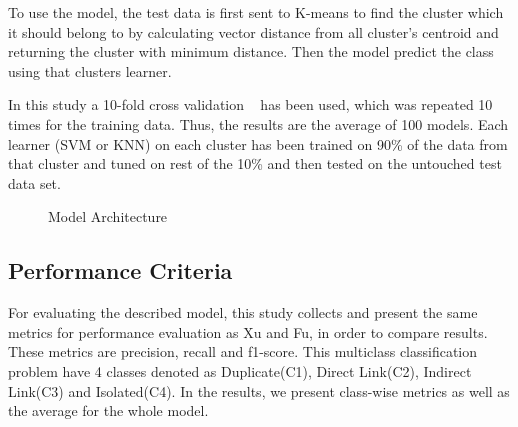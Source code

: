 \documentclass[sigconf]{acmart}
\theoremstyle{break}
\begin{document}
    To use the model, the test data is first sent to K-means to find the cluster which it should belong to by calculating vector distance from all cluster's centroid and returning the cluster with minimum distance. Then the model predict the class using that cluster\textquotesingle s learner.
    
    In this study a 10-fold cross validation ~\cite{kohavi1995study} has been used, which was repeated 10 times for the training data. Thus, the results are the average of 100 models. Each learner (SVM or KNN) on each cluster has been trained on 90\% of the data from that cluster and tuned on rest of the 10\% and then tested on the untouched test data set. 
    
    \begin{figure}
        \centering
        \caption{Model Architecture}
        \label{fig:our_model}
    \end{figure}
    
    
    
    \subsection{Performance Criteria}
    \label{sssec:performance_criteria}
    For evaluating the described model, this study collects and present the same metrics for performance evaluation as Xu and Fu, in order to compare results. These metrics are precision, recall and f1-score. This multiclass classification problem have 4 classes denoted as Duplicate(C1), Direct Link(C2), Indirect Link(C3) and Isolated(C4). In the results, we present class-wise metrics as well as the average for the whole model.
    
\end{document}
